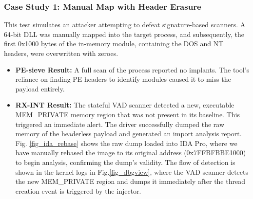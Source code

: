 \documentclass[journal]{IEEEtran}
\begin{document}
\subsubsection{Case Study 1: Manual Map with Header Erasure}
This test simulates an attacker attempting to defeat signature-based scanners. A 64-bit DLL was manually mapped into the target process, and subsequently, the first 0x1000 bytes of the in-memory module, containing the DOS and NT headers, were overwritten with zeroes.
\begin{itemize}
\item \textbf{PE-sieve Result:} A full scan of the process reported no implants. The tool's reliance on finding PE headers to identify modules caused it to miss the payload entirely.
\item \textbf{RX-INT Result:} The stateful VAD scanner detected a new, executable MEM\_PRIVATE memory region that was not present in its baseline. This triggered an immediate alert. The driver successfully dumped the raw memory of the headerless payload and generated an import analysis report. Fig. \ref{fig_ida_rebase} shows the raw dump loaded into IDA Pro, where we have manually rebased the image to its original address (0x7FFBFBBE1000) to begin analysis, confirming the dump's validity. The flow of detection is shown in the kernel logs in Fig.\ref{fig_dbgview}, where the VAD scanner detects the new MEM\_PRIVATE region and dumps it immediately after the thread creation event is triggered by the injector.
\end{itemize}
\end{document}
